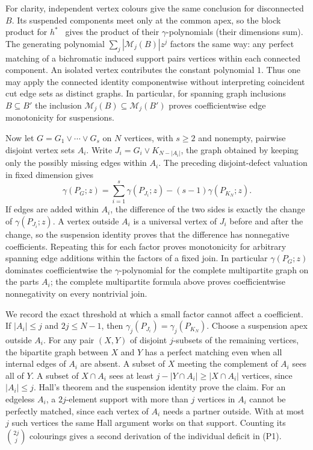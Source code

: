 \documentclass[11pt,a4paper]{article}
\theoremstyle{definition}\newtheorem{problem}[theorem]{Problem}
\begin{document}
For clarity, independent vertex colours give the same conclusion for disconnected $B$. Its suspended components meet only at the common apex, so the block product for $h^*$~\cite[Proposition~5.2]{OTanti} gives the product of their $\gamma$-polynomials (their dimensions sum). The generating polynomial $\sum_j |\mathcal M_j(B)|z^j$ factors the same way: any perfect matching of a bichromatic induced support pairs vertices within each connected component. An isolated vertex contributes the constant polynomial $1$. Thus one may apply the connected identity componentwise without interpreting coincident cut edge sets as distinct graphs. In particular, for spanning graph inclusions $B\subseteq B'$ the inclusion $\mathcal M_j(B)\subseteq\mathcal M_j(B')$ proves coefficientwise edge monotonicity for suspensions.

Now let $G=G_1\vee\cdots\vee G_s$ on $N$ vertices, with $s\ge2$ and nonempty, pairwise disjoint vertex sets $A_i$. Write $J_i=G_i\vee K_{N-|A_i|}$, the graph obtained by keeping only the possibly missing edges within $A_i$. The preceding disjoint-defect valuation in fixed dimension gives
\[
 \gamma(P_G;z)=\sum_{i=1}^s\gamma(P_{J_i};z)-(s-1)\gamma(P_{K_N};z).
\]
If edges are added within $A_i$, the difference of the two sides is exactly the change of $\gamma(P_{J_i};z)$. A vertex outside $A_i$ is a universal vertex of $J_i$ before and after the change, so the suspension identity proves that the difference has nonnegative coefficients. Repeating this for each factor proves monotonicity for arbitrary spanning edge additions within the factors of a fixed join. In particular $\gamma(P_G;z)$ dominates coefficientwise the $\gamma$-polynomial for the complete multipartite graph on the parts $A_i$; the complete multipartite formula above proves coefficientwise nonnegativity on every nontrivial join.

We record the exact threshold at which a small factor cannot affect a coefficient. If $|A_i|\le j$ and $2j\le N-1$, then $\gamma_j(P_{J_i})=\gamma_j(P_{K_N})$. Choose a suspension apex outside $A_i$. For any pair $(X,Y)$ of disjoint $j$-subsets of the remaining vertices, the bipartite graph between $X$ and $Y$ has a perfect matching even when all internal edges of $A_i$ are absent. A subset of $X$ meeting the complement of $A_i$ sees all of $Y$. A subset of $X\cap A_i$ sees at least $j-|Y\cap A_i|\ge |X\cap A_i|$ vertices, since $|A_i|\le j$. Hall's theorem and the suspension identity prove the claim. For an edgeless $A_i$, a $2j$-element support with more than $j$ vertices in $A_i$ cannot be perfectly matched, since each vertex of $A_i$ needs a partner outside. With at most $j$ such vertices the same Hall argument works on that support. Counting its $\binom{2j}{j}$ colourings gives a second derivation of the individual deficit in (P1).
\end{document}
